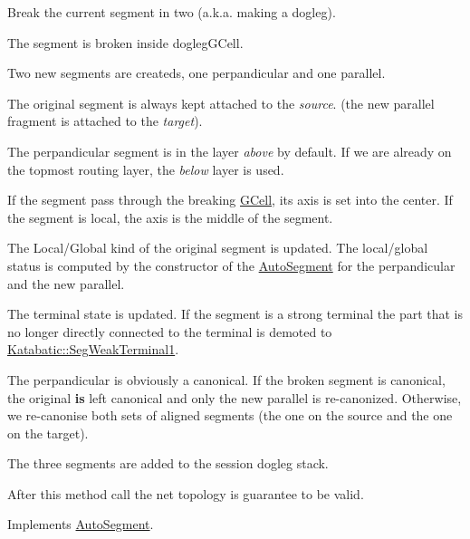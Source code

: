 Break the current segment in two (a.\+k.\+a. making a dogleg).
\begin{DoxyItemize}
\item The segment is broken inside {\ttfamily dogleg\+G\+Cell}.
\item Two new segments are createds, one perpandicular and one parallel.
\item The original segment is always kept attached to the {\itshape source}. (the new parallel fragment is attached to the {\itshape target}).
\item The perpandicular segment is in the layer {\itshape above} by default. If we are already on the topmost routing layer, the {\itshape below} layer is used.
\item If the segment pass through the breaking \hyperlink{classKatabatic_1_1GCell}{G\+Cell}, it\textquotesingle{}s axis is set into the center. If the segment is local, the axis is the middle of the segment.
\item The Local/\+Global kind of the original segment is updated. The local/global status is computed by the constructor of the \hyperlink{classKatabatic_1_1AutoSegment}{Auto\+Segment} for the perpandicular and the new parallel.
\item The terminal state is updated. If the segment is a strong terminal the part that is no longer directly connected to the terminal is demoted to \hyperlink{namespaceKatabatic_a94585537ee1724ea9315578ec54380f4a7b3e09b8ab4cf676fd308535d7fba892}{Katabatic\+::\+Seg\+Weak\+Terminal1}.
\item The perpandicular is obviously a canonical. If the broken segment is canonical, the original {\bfseries is} left canonical and only the new parallel is re-\/canonized. Otherwise, we re-\/canonise both sets of aligned segments (the one on the source and the one on the target).
\item The three segments are added to the session dogleg stack.
\end{DoxyItemize}

After this method call the net topology is guarantee to be valid.

  

Implements \hyperlink{classKatabatic_1_1AutoSegment_a37a14b40295ccb50cd5001891385807b}{Auto\+Segment}.



